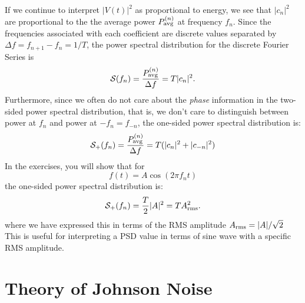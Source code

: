 \documentclass[12pt,oneside]{book}
\begin{document}
If we continue to interpret $|V(t)|^2$ as proportional to energy, we see that $|c_n|^2$ are proportional to the the average power $P_{\rm avg}^{(n)}$ at frequency $f_n$.  Since the frequencies associated with each coefficient are discrete values separated by $\Delta f = f_{n+1} - f_{n} = 1/T $, the power spectral distribution for the discrete Fourier Series is
\begin{displaymath}
\mathcal{S}(f_n) = \frac{P_{\rm avg}^{(n)}}{\Delta f} = T |c_n|^2.
\end{displaymath}
Furthermore, since we often do not care about the {\em phase} information in the two-sided power spectral distribution, that is, we don't care to distinguish between power at $f_n$ and power at $-f_n = f_{-n}$, the one-sided power spectral distribution is:
\begin{equation}
\mathcal{S}_{+}(f_n) = \frac{P_{\rm avg}^{(n)}}{\Delta f} = T (|c_n|^2 + |c_{-n}|^2) \label{eqn:discretepsd}
\end{equation}
In the exercises, you will show that for
\begin{displaymath}
f(t) = A \cos( 2 \pi f_n t)
\end{displaymath}
the one-sided power spectral distribution is:
\begin{equation}
\mathcal{S}_{+}(f_n) = \frac{T}{2} |A|^2  = T A^2_{\rm rms} \label{eqn:psdcalib}.
\end{equation}
where we have expressed this in terms of the RMS amplitude $A_{\rm rms} = |A|/\sqrt{2}$  This is useful for interpreting a PSD value in terms of sine wave with a specific RMS amplitude.

\section{Theory of Johnson Noise}
\end{document}
